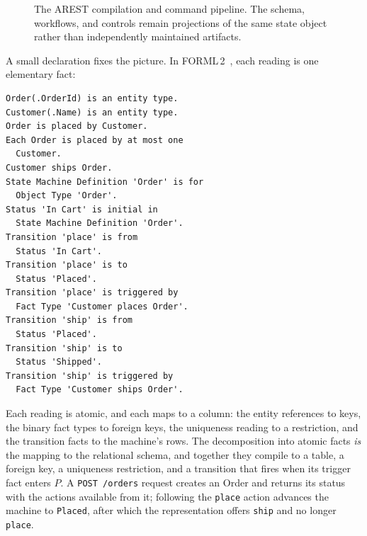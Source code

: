 \documentclass[10pt,twocolumn]{article}
\theoremstyle{plain}
\theoremstyle{definition}
\begin{document}
\begin{figure}[t]
\centering
\setlength{\fboxsep}{7pt}
\caption{The AREST compilation and command pipeline. The schema, workflows, and controls remain projections of the same state object rather than independently maintained artifacts.}
\label{fig:pipeline}
\end{figure}

A small declaration fixes the picture. In FORML\,2~\cite{norma}, each reading is one elementary fact:
\begin{lstlisting}
Order(.OrderId) is an entity type.
Customer(.Name) is an entity type.
Order is placed by Customer.
Each Order is placed by at most one
  Customer.
Customer ships Order.
State Machine Definition 'Order' is for
  Object Type 'Order'.
Status 'In Cart' is initial in
  State Machine Definition 'Order'.
Transition 'place' is from
  Status 'In Cart'.
Transition 'place' is to
  Status 'Placed'.
Transition 'place' is triggered by
  Fact Type 'Customer places Order'.
Transition 'ship' is from
  Status 'Placed'.
Transition 'ship' is to
  Status 'Shipped'.
Transition 'ship' is triggered by
  Fact Type 'Customer ships Order'.
\end{lstlisting}
Each reading is atomic, and each maps to a column: the entity references to keys, the binary fact types to foreign keys, the uniqueness reading to a restriction, and the transition facts to the machine's rows. The decomposition into atomic facts \emph{is} the mapping to the relational schema, and together they compile to a table, a foreign key, a uniqueness restriction, and a transition that fires when its trigger fact enters $P$. A \texttt{POST /orders} request creates an Order and returns its status with the actions available from it; following the \texttt{place} action advances the machine to \texttt{Placed}, after which the representation offers \texttt{ship} and no longer \texttt{place}.
\end{document}
